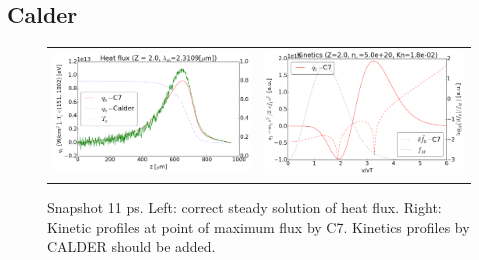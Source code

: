 \subsection{Calder}
\label{sec:CALDERcode}

\begin{figure}[tbh]
  \begin{center}
    \begin{tabular}{cc}
      \includegraphics[width=\figscale\textwidth]{../VFPdata/C7_Calder_case1_heatflux.png} & 
      \includegraphics[width=\figscale\textwidth]{../VFPdata/C7_Calder_case1_kinetics.png}
    \end{tabular}
  \caption{  
  Snapshot 11 ps. Left: correct steady solution of heat flux. Right: Kinetic profiles at point of maximum flux by C7. Kinetics profiles by CALDER should be added.
  }
  \end{center}
  \label{fig:C7_CALDER_case1}
\end{figure}

\clearpage
